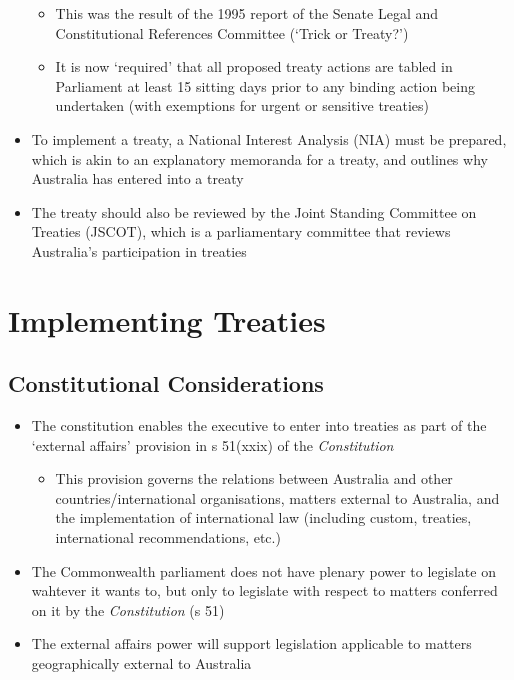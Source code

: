 \begin{itemize}
\begin{itemize}
        \item This was the result of the 1995 report of the Senate Legal and Constitutional References Committee (`Trick or Treaty?')
        \item It is now `required' that all proposed treaty actions are tabled in Parliament at least 15 sitting days prior to any binding action being undertaken (with exemptions for urgent or sensitive treaties)
    \end{itemize}
    \item To implement a treaty, a National Interest Analysis (NIA) must be prepared, which is akin to an explanatory memoranda for a treaty, and outlines why Australia has entered into a treaty
    \item The treaty should also be reviewed by the Joint Standing Committee on Treaties (JSCOT), which is a parliamentary committee that reviews Australia's participation in treaties
\end{itemize}

\section{Implementing Treaties}
\subsection{Constitutional Considerations}
\begin{itemize}
    \item The constitution enables the executive to enter into treaties as part of the `external affairs' provision in s 51(xxix) of the \textit{Constitution}
    \begin{itemize}
        \item This provision governs the relations between Australia and other countries/international organisations, matters external to Australia, and the implementation of international law (including custom, treaties, international recommendations, etc.)
    \end{itemize}
    \item The Commonwealth parliament does not have plenary power to legislate on wahtever it wants to, but only to legislate with respect to matters conferred on it by the \textit{Constitution} (s 51)
    \item The external affairs power will support legislation applicable to matters geographically external to Australia
\end{itemize}

